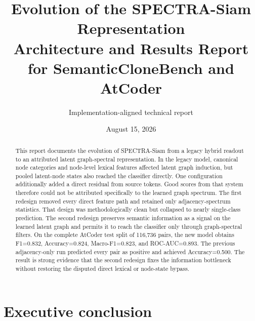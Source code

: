 \documentclass[11pt,a4paper]{article}
\title{\vspace{-12mm}\textbf{Evolution of the SPECTRA-Siam Representation}\\[3mm]
\Large Architecture and Results Report for SemanticCloneBench and AtCoder}
\author{Implementation-aligned technical report}
\date{August 15, 2026}
\begin{document}
\maketitle
\thispagestyle{empty}

\begin{abstract}
This report documents the evolution of SPECTRA-Siam from a legacy hybrid
readout to an attributed latent graph-spectral representation. In the legacy
model, canonical node categories and node-level lexical features affected
latent graph induction, but pooled latent-node states also reached the
classifier directly. One configuration additionally added a direct residual
from source tokens. Good scores from that system therefore could not be
attributed specifically to the learned graph spectrum. The first redesign
removed every direct feature path and retained only adjacency-spectrum
statistics. That design was methodologically clean but collapsed to nearly
single-class prediction. The second redesign preserves semantic information as
a signal on the learned latent graph and permits it to reach the classifier
only through graph-spectral filters. On the complete AtCoder test split of
116,736 pairs, the new model obtains F1=0.832, Accuracy=0.824,
Macro-F1=0.823, and ROC-AUC=0.893. The previous adjacency-only run predicted
every pair as positive and achieved Accuracy=0.500. The result is strong
evidence that the second redesign fixes the information bottleneck without
restoring the disputed direct lexical or node-state bypass.
\end{abstract}

\begin{center}
\end{center}

\clearpage
{\small\tableofcontents}
\clearpage

\section{Executive conclusion}
\end{document}
